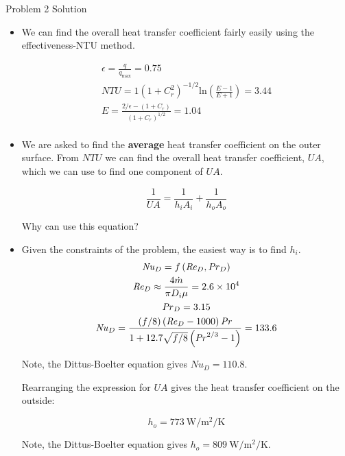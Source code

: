 \documentclass[9pt, aspectratio=169, handout]{beamer}
\begin{document}
\begin{frame}[allowframebreaks]{Problem 2 Solution}
    \begin{itemize}
        \item We can find the overall heat transfer coefficient fairly easily using the effectiveness-NTU method.
            
            \begin{gather*}
                \epsilon = \frac{q}{q_{\mathrm{max}}} = 0.75 \\
                \mathit{NTU} = 1 \left( 1 + C_r^2 \right)^{-1/2} \mathrm{ln} \left( \frac{E - 1}{E + 1} \right) = 3.44 \\
                E = \frac{2/\epsilon - \left( 1 + C_r \right)}{\left( 1 + C_r \right)^{1/2}} = 1.04 \\
            \end{gather*}

        \item We are asked to find the \textbf{average} heat transfer coefficient on the outer surface.
            From $\mathit{NTU}$ we can find the overall heat transfer coefficient, $\mathit{UA}$, which we can use to find one component of $\mathit{UA}$.
            
            \begin{equation*}
                \frac{1}{\mathit{UA}} = \frac{1}{h_i A_i} + \frac{1}{h_o A_o}
            \end{equation*}
            
            Why can use this equation?
        \item Given the constraints of the problem, the easiest way is to find $h_i$.
            \begin{gather*}
                \mathit{Nu}_D = f \left( \mathit{Re}_D, \mathit{Pr}_D \right) \\
                \mathit{Re}_D \approx \frac{4 \dot{m}}{\pi D_i \mu} = \num{2.6 e 4} \\
                \mathit{Pr}_D = 3.15 \\
                \mathit{Nu}_D = \frac{\left( f/8 \right) \left( \mathit{Re}_D - 1000 \right) \mathit{Pr}}{1 + 12.7 \sqrt{f/8} \left( \mathit{Pr}^{2/3} - 1 \right)} = 133.6
            \end{gather*}

            Note, the Dittus-Boelter equation gives $\mathit{Nu}_D = 110.8$.

            Rearranging the expression for $\mathit{UA}$ gives the heat transfer coefficient on the outside:
            
            \begin{equation*}
                h_o = \SI{773}{\watt\per\square\meter\per\kelvin}
            \end{equation*}

            Note, the Dittus-Boelter equation gives $h_o = \SI{809}{\watt\per\square\meter\per\kelvin}$.
    \end{itemize}
\end{frame}
\end{document}
